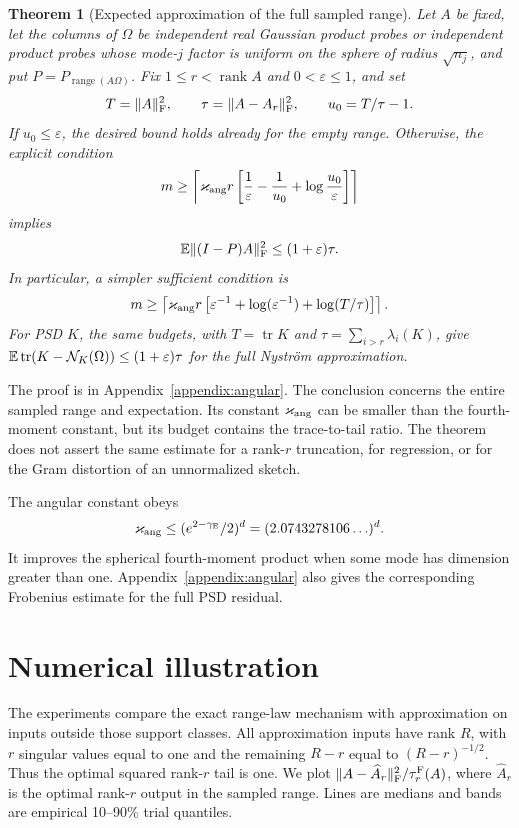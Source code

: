 \documentclass[11pt,a4paper]{article}
\newtheorem{theorem}{Theorem}[section]
\theoremstyle{definition}\newtheorem{definition}[theorem]{Definition}
\theoremstyle{remark}\newtheorem{remark}[theorem]{Remark}
\numberwithin{equation}{section}
\newcommand{\norm}[1]{\lVert#1\rVert}\newcommand{\ip}[2]{\langle#1,#2\rangle}
\DeclareMathOperator{\tr}{tr}\DeclareMathOperator{\rank}{rank}
\DeclareMathOperator{\range}{range}\DeclareMathOperator{\diag}{diag}
\begin{document}
\begin{theorem}[Expected approximation of the full sampled range]
\label{app:thm:angular-range}
Let $A$ be fixed, let the columns of $\Omega$ be independent real
Gaussian product probes or independent product probes whose mode-$j$
factor is uniform on the sphere of radius $\sqrt{n_j}$, and put
$P=P_{\range(A\Omega)}$.
Fix $1\le r<\rank A$ and $0<\varepsilon\le1$, and set
\[
 T=\norm A_\F^2,\qquad
 \tau=\norm{A-A_r}_\F^2,\qquad
 u_0=T/\tau-1.
\]
If $u_0\le\varepsilon$, the desired bound holds already for the empty
range. Otherwise, the explicit condition
\begin{equation}\label{app:eq:angular-budget-exact}
 m\ge\left\lceil\varkappa_{\rm ang}r
 \left[\frac1\varepsilon-\frac1{u_0}
                     +\log\frac{u_0}{\varepsilon}\right]\right\rceil
\end{equation}
implies
\begin{equation}\label{app:eq:angular-range-error}
 \E\norm{(I-P)A}_\F^2\le(1+\varepsilon)\tau.
\end{equation}
In particular, a simpler sufficient condition is
\begin{equation}\label{app:eq:angular-budget-simple}
 m\ge\left\lceil\varkappa_{\rm ang}r
 \left[\varepsilon^{-1}+\log(\varepsilon^{-1})
                              +\log(T/\tau)\right]\right\rceil.
\end{equation}
For PSD $K$, the same budgets, with $T=\tr K$ and
$\tau=\sum_{i>r}\lambda_i(K)$, give
$\E\tr(K-\mathcal N_K(\Omega))\le(1+\varepsilon)\tau$ for the full
Nystr\"om approximation.
\end{theorem}

The proof is in Appendix~\ref{appendix:angular}.
The conclusion concerns the entire sampled range and expectation.
Its constant $\varkappa_{\rm ang}$ can be smaller than the fourth-moment
constant, but its budget contains the trace-to-tail ratio.
The theorem does not assert the same estimate for a rank-$r$ truncation,
for regression, or for the Gram distortion of an unnormalized sketch.

The angular constant obeys
\[
 \varkappa_{\rm ang}\le(e^{2-\gamma_{\rm E}}/2)^d
 =(2.0743278106\ldots)^d.
\]
It improves the spherical fourth-moment product when some mode has
dimension greater than one. Appendix~\ref{appendix:angular} also gives
the corresponding Frobenius estimate for the full PSD residual.

\section{Numerical illustration}\label{sec:numerics}
The experiments compare the exact range-law mechanism with approximation
on inputs outside those support classes. All approximation inputs have
rank $R$, with $r$ singular values equal to one and the remaining
$R-r$ equal to $(R-r)^{-1/2}$. Thus the optimal squared rank-$r$
tail is one. We plot
$\|A-\widehat A_r\|_\mathrm F^2/\tau_r^{\rm F}(A)$, where $\widehat A_r$
is the optimal rank-$r$ output in the sampled range.
Lines are medians and bands are empirical 10--90\% trial quantiles.
\end{document}
